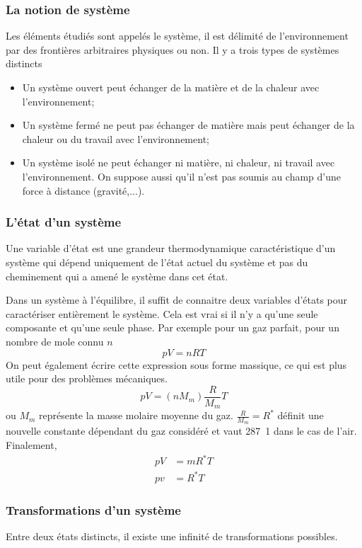 \subsubsection{La notion de système}
Les éléments étudiés sont appelés le système,
il est délimité de l'environnement par des
frontières arbitraires physiques ou non.
Il y a trois types de systèmes distincts
\begin{itemize}
  \item Un système ouvert peut échanger de la matière et
    de la chaleur avec l'environnement;
  \item Un système fermé ne peut pas échanger de matière
    mais peut échanger de la chaleur ou du travail avec l'environnement;
  \item Un système isolé ne peut échanger ni matière,
    ni chaleur, ni travail avec l'environnement.
    On suppose aussi qu'il n'est pas soumis au champ
    d'une force à distance (gravité,...).
\end{itemize}

\subsubsection{L'état d'un système}
Une variable d'état est une grandeur thermodynamique caractéristique
d'un système qui dépend uniquement de l'état actuel du système et
pas du cheminement qui a amené le système dans cet état.

Dans un système à l'équilibre, il suffit de connaitre deux variables d'états
pour caractériser entièrement le système.
Cela est vrai si il n'y a qu'une seule composante et qu'une seule phase.
Par exemple pour un gaz parfait, pour un nombre de mole connu $n$
\[ pV = nRT \]
On peut également écrire cette expression sous forme massique,
ce qui est plus utile pour des problèmes mécaniques.
\[ pV = (nM_m) \frac R {M_m} T \]
ou $M_m$ représente la masse molaire moyenne du gaz.
$\frac{R}{M_m} = R^*$ définit une nouvelle constante dépendant du gaz considéré
et vaut \si{287.1}{\joule\per\kilogram\kelvin} dans le cas de l'air.
Finalement,
\begin{align*}
  pV & = mR^*T\\
  pv & = R^*T
\end{align*}

\subsubsection{Transformations d'un système}
Entre deux états distincts,
il existe une infinité de transformations possibles.

